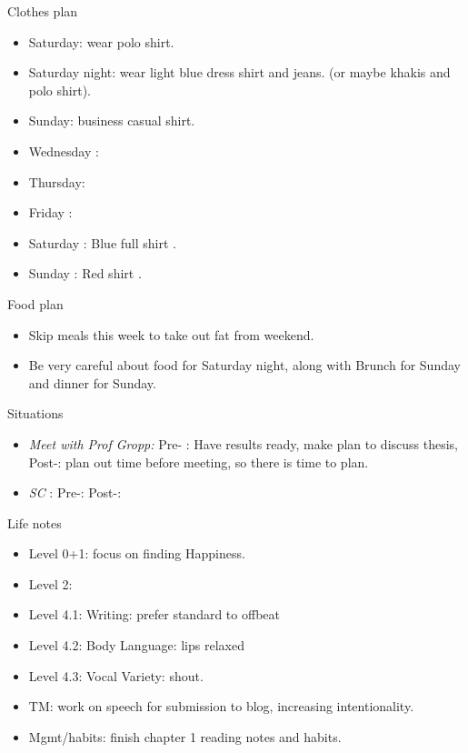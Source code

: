 \documentclass[serif, mathserif, final]{beamer}
\begin{document}
\begin{frame}{}
\begin{columns}
\begin{column}{0.25\linewidth}
  \begin{block}{Clothes plan} 
    \begin{itemize} 
      \tiny \item \tiny Saturday: wear polo shirt. 
    \item \tiny Saturday night: wear light blue dress shirt and jeans. (or maybe khakis and polo shirt). 
    \item \tiny Sunday: business casual shirt. 
    \item \tiny Wednesday : 
    \item \tiny Thursday: 
    \item \tiny Friday : 
    \item \tiny Saturday : Blue full shirt . 
    \item \tiny Sunday : Red shirt .
    \end{itemize} 
  \end{block} 
  \begin{block}{ Food plan } 
    \begin{itemize} 
      \tiny \item \tiny Skip meals this week to take out fat from weekend. 
    \item \tiny Be very careful about food for Saturday night, along with Brunch for Sunday and dinner for Sunday. 
    \end{itemize} 
  \end{block} 
  
  \begin{block}{Situations} 
    \begin{itemize} 
    \item \tiny \textit{Meet with Prof Gropp: } Pre- : Have results ready, make plan to discuss thesis, Post-: plan out time before meeting, so there is time to plan. 
    \item \tiny  \textit{SC} : Pre-:   Post-:  
    \end{itemize}
  \end{block}

  \begin{block} {Life notes} 
    \begin{itemize} 
      \tiny \item \tiny Level 0+1: focus on finding Happiness. 
    \item \tiny Level 2: 
    \item \tiny Level 4.1: Writing: prefer standard to offbeat 
    \item \tiny Level 4.2: Body Language: lips relaxed
    \item \tiny Level 4.3: Vocal Variety: shout. 
    \item \tiny TM: work on speech for submission to blog, increasing intentionality. 
    \item \tiny Mgmt/habits: finish chapter 1 reading notes and habits. 
    \end{itemize}     
  \end{block} 
\end{column} %


\end{columns}
\end{frame}
\end{document}
